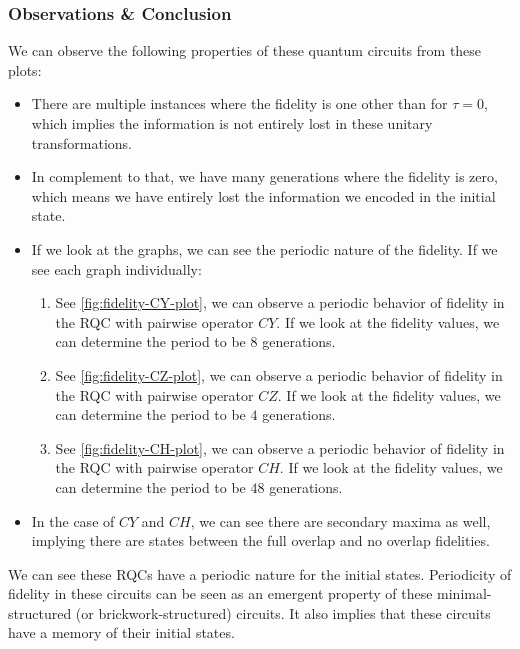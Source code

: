 \documentclass[11pt, oneside, listof=totoc]{scrbook}
\begin{document}
\subsubsection{Observations \& Conclusion}
We can observe the following properties of these quantum circuits from these plots:
\begin{itemize}
    \item There are multiple instances where the fidelity is one other than for \(\tau = 0\), which implies the information is not entirely lost in these unitary transformations.

    \item In complement to that, we have many generations where the fidelity is zero, which means we have entirely lost the information we encoded in the initial state.

    \item If we look at the graphs, we can see the periodic nature of the fidelity. If we see each graph individually:
          \begin{enumerate}
              \item See \cref{fig:fidelity-CY-plot}, we can observe a periodic behavior of fidelity in the RQC with pairwise operator \(CY\). If we look at the fidelity values, we can determine the period to be \(8\) generations.

              \item See \cref{fig:fidelity-CZ-plot}, we can observe a periodic behavior of fidelity in the RQC with pairwise operator \(CZ\). If we look at the fidelity values, we can determine the period to be \(4\) generations.

              \item See \cref{fig:fidelity-CH-plot}, we can observe a periodic behavior of fidelity in the RQC with pairwise operator \(CH\). If we look at the fidelity values, we can determine the period to be \(48\) generations.
          \end{enumerate}
    \item In the case of \(CY\) and \(CH\), we can see there are secondary maxima as well, implying there are states between the full overlap and no overlap fidelities.
\end{itemize}

We can see these RQCs have a periodic nature for the initial states. Periodicity of fidelity in these circuits can be seen as an emergent property of these minimal-structured (or brickwork-structured) circuits. It also implies that these circuits have a memory of their initial states.
\end{document}
